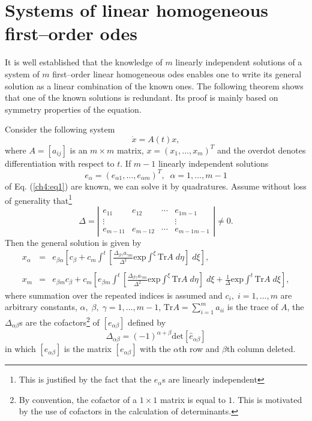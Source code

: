 \section{Systems of linear homogeneous  first--order odes}
It is well established that the knowledge of $m$ linearly independent
solutions of a system of $m$ first--order linear homogeneous odes enables
one to write its general solution as a linear combination of the known ones.
The following theorem shows that one of the known solutions is redundant.
Its proof is mainly based on symmetry properties of the equation.
\begin{theo}
\label{ch4:theo2}
\begin{em} 
Consider the following system
\begin{equation}
\dot x=A(t)x,  \label{ch4:eq1}
\end{equation}
where $A=[a_{ij}]$ is an $m\times m$ matrix, $x=(x_1,\ldots,x_m)^T$ and the  
overdot denotes  differentiation with respect to $t$. If $m-1$ 
linearly independent solutions
\begin{equation}
e_{\alpha}=(e_{\alpha 1},\ldots ,e_{\alpha m})^T 
,\;\;\alpha=1,\ldots,m-1
\label{ch4:eq2}
\end{equation}
of Eq. (\ref{ch4:eq1}) are known, we can solve it 
by quadratures. Assume without loss of generality that\footnote{This
is justified by the fact that the $e_{\alpha}$s
are linearly independent}
\[\Delta=\left |\begin{array}{cccc}
e_{11}&e_{12}&\cdots&e_{1m-1}\\
\vdots&     &       & \vdots\\
e_{m-11}&e_{m-12} & \cdots &e_{m-1m-1}
\end{array} \right | \ne 0.\]
Then the general solution is given by 
\begin{eqnarray}
x_{\alpha} &=& e_{\beta \alpha}\left [
 c_{\beta}+c_m\int^{t}\left [ \frac{\Delta_{\beta \gamma} 
a_{\gamma m}}{\Delta^2}\mbox{exp}\int^{\xi}\mbox{Tr} A\; d\eta 
\right ]\;d\xi \right ], \nonumber \\
& &                          \label{ch4:eq2p} \\
x_m &=& e_{\beta m}c_{\beta}+c_m \left [ 
e_{\beta m}\int^{t}\left [ \frac{\Delta_{\beta \gamma} 
a_{\gamma m}}{\Delta^2}\mbox{exp}\int^{\xi}\mbox{Tr} A\; d\eta 
\right ] \; d\xi +\frac{1}{\Delta}\mbox{exp}\int^{t}\mbox{Tr}A\;d\xi \right ]
\nonumber,
\end{eqnarray}
where summation over the repeated indices is assumed  
and  $c_i,\;i=1,\ldots,m$ are arbitrary constants, 
$\alpha,\;\beta,\;\gamma=1,\ldots,m-1$,
$\mbox{Tr} A=\sum_{i=1}^{m}a_{ii}$
is the trace of $A$, the $\Delta_{\alpha \beta}$s are  
the cofactors\footnote{By convention, the cofactor of a $1\times 1$ 
matrix is 
equal to $1$. This is motivated by the use of cofactors in the calculation 
of determinants.}
of $[e_{\alpha \beta}] $ defined by
\[\Delta_{\alpha \beta}=(-1)^{\alpha +\beta}\mbox{det}[\hat e_{\alpha \beta}]\]
in which $[\hat e_{\alpha \beta}]$ is the matrix $[e_{\alpha \beta}]$  with the
$\alpha$th row and $\beta$th column deleted.
\end{em}
\end{theo}
